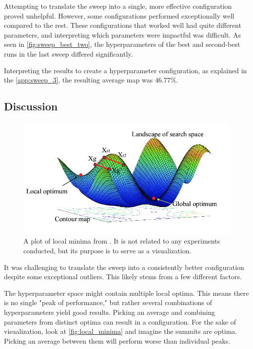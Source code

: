 Attempting to translate the sweep into a single, more effective configuration proved unhelpful. However, some configurations performed exceptionally well compared to the rest. These configurations that worked well had quite different parameters, and interpreting which parameters were impactful was difficult. As seen in \autoref{fig:sweep_best_two}, the hyperparameters of the best and second-best runs in the last sweep differed significantly. 

Interpreting the results to create a hyperparameter configuration, as explained in the \autoref{app:sweep_3}, the resulting average \acrshort{map} was \(46.77\%\). 

\subsection{Discussion}
\label{ssec:ex4_discussion}

\begin{figure}
    \centering
    \includegraphics[width=0.75\linewidth]{figures/local_minima.png}
    \caption{A plot of local minima from \cite{fig:multiple_local_minima}. It is not related to any experiments conducted, but its purpose is to serve as a visualization.}
    \label{fig:local_minima}
\end{figure}

It was challenging to translate the sweep into a consistently better configuration despite some exceptional outliers. This likely stems from a few different factors. 

The hyperparameter space might contain multiple local optima. This means there is no single "peak of performance," but rather several combinations of hyperparameters yield good results. Picking an average and combining parameters from distinct optima can result in a configuration. For the sake of visualization, look at \autoref{fig:local_minima} and imagine the summits are optima. Picking an average between them will perform worse than individual peaks. 

